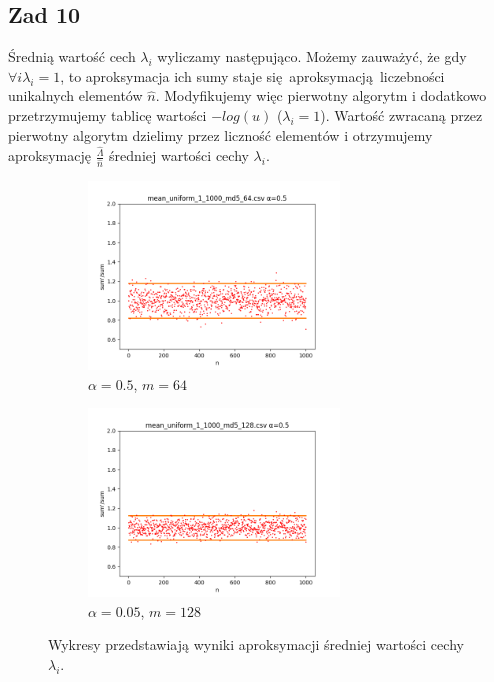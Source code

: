 \documentclass[a4paper,11pt]{article}
\theoremstyle{mytheor}
\begin{document}
\subsection*{Zad 10}
Średnią wartość cech $\lambda_i$ wyliczamy następująco. Możemy zauważyć, że gdy $\forall i \lambda_i = 1$, to aproksymacja ich sumy staje się aproksymacją liczebności unikalnych elementów $\hat{n}$. Modyfikujemy więc pierwotny algorytm i dodatkowo przetrzymujemy tablicę wartości $-log(u)$ ($\lambda_i = 1$). Wartość zwracaną przez pierwotny algorytm dzielimy przez liczność elementów i otrzymujemy aproksymację $\frac{\hat{\Lambda}}{\hat{n}}$ średniej wartości cechy $\lambda_i$.
\begin{figure}[H]
    \begin{subfigure}{0.5\textwidth}
        \includegraphics[width=1.0\linewidth, height=5cm]{mean/mean_uniform_1_1000_md5_64_m_64_a_0_5.png}
        \caption{$\alpha = 0.5$, $m = 64$}
        \label{fig:subim2}
    \end{subfigure}
    \begin{subfigure}{0.5\textwidth}
        \includegraphics[width=1.0\linewidth, height=5cm]{mean/mean_uniform_1_1000_md5_128_m_128_a_0_5.png}
        \caption{$\alpha = 0.05$, $m = 128$}
        \label{fig:subim2}
    \end{subfigure}

    \caption{Wykresy przedstawiają wyniki aproksymacji średniej wartości cechy $\lambda_i$.}
    \label{fig:uniform_md5}
\end{figure}
\end{document}
